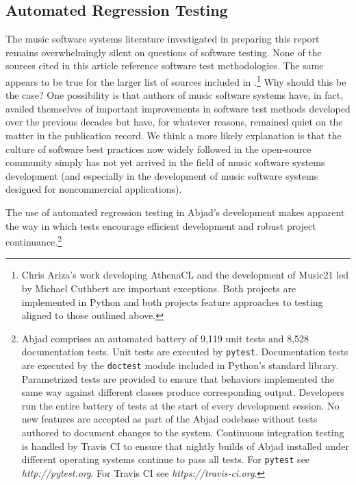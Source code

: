 \documentclass{article}
\begin{document}
\subsection{Automated Regression Testing}

The music software systems literature investigated in preparing this report
remains overwhelmingly silent on questions of software testing. None of the
sources cited in this article reference software test methodologies. The same
appears to be true for the larger list of sources included in
\cite{trevino2013compositional}.\footnote{Chris Ariza's work developing
AthenaCL \cite{Ariza2005} and the development of Music21 \cite{Ariza2010} led
by Michael Cuthbert are important exceptions. Both projects are implemented in
Python and both projects feature approaches to testing aligned to those
outlined above.} Why should this be the case? One possibility is that authors
of music software systems have, in fact, availed themselves of important
improvements in software test methods developed over the previous decades but
have, for whatever reasons, remained quiet on the matter in the publication
record. We think a more likely explanation is that the culture of software best
practices now widely followed in the open-source community simply has not yet
arrived in the field of music software systems development (and especially in
the development of music software systems designed for noncommercial
applications).

The use of automated regression testing in Abjad's development makes apparent
the way in which tests encourage efficient development and robust project
continuance.\footnote{Abjad comprises an automated battery of 9,119 unit tests
and 8,528 documentation tests. Unit tests are executed by \texttt{pytest}.
Documentation tests are executed by the \texttt{doctest} module included in
Python's standard library. Parametrized tests are provided to ensure that
behaviors implemented the same way against different classes produce
corresponding output. Developers run the entire battery of tests at the start
of every development session. No new features are accepted as part of the Abjad
codebase without tests authored to document changes to the system. Continuous
integration testing is handled by Travis CI to ensure that nightly builds of
Abjad installed under different operating systems continue to pass all tests.
For \texttt{pytest} see \textit{http://pytest.org}. For Travis CI see
\textit{https://travis-ci.org}.}
\end{document}
